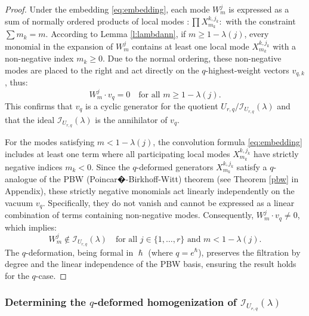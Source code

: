 \documentclass[reqno,11pt]{amsart}
\theoremstyle{plain}
\theoremstyle{definition}
\theoremstyle{remark}
\numberwithin{equation}{section}
\newcommand{\1}{\mathds{1}}
\newcommand{\2}{\frac{1}{2}}
\begin{document}
{\begin{proof}
					{Under the embedding \eqref{eq:embedding}, each mode $W^j_m$ is expressed as a sum of normally ordered products of local modes $: \prod X^{k,j_k}_{m_k} :$ with the constraint $\sum m_k = m$. 
						According to Lemma \ref{l:lambdann}, if $m \geq 1 - \lambda(j)$, every monomial in the expansion of $W^j_m$ contains at least one local mode $X^{k,j_k}_{m_k}$ with a non-negative index $m_k \geq 0$. Due to the normal ordering, these non-negative modes are placed to the right and act directly on the $q$-highest-weight vectors $v_{q,k}$, thus:
						\begin{equation}
							W^j_m \cdot v_q = 0 \quad \text{for all } m \geq 1 - \lambda(j).
						\end{equation}
						This confirms that $v_q$ is a cyclic generator for the quotient $U_{r,q} / \mathcal{I}_{U_{r,q}}(\lambda)$ and that the ideal $\mathcal{I}_{U_{r,q}}(\lambda)$ is the annihilator of $v_q$.}
					
					{For the modes satisfying $m < 1 - \lambda(j)$, the convolution formula \eqref{eq:embedding} includes at least one term where all participating local modes $X^{k,j_k}_{m_k}$ have strictly negative indices $m_k < 0$. 
						Since the $q$-deformed generators $X^{k,j_k}_{m_k}$ satisfy a $q$-analogue of the PBW (Poincar�-Birkhoff-Witt) theorem (see Theorem \ref{pbw} in Appendix), these strictly negative monomials act linearly independently on the vacuum $v_q$. Specifically, they do not vanish and cannot be expressed as a linear combination of terms containing non-negative modes. 
						Consequently, $W^j_m \cdot v_q \neq 0$, which implies:
						\begin{equation}
							W^j_m \notin \mathcal{I}_{U_{r,q}}(\lambda) \quad \text{for all } j \in \{1, \dots, r\} \text{ and } m < 1 - \lambda(j).
						\end{equation}
						The $q$-deformation, being formal in $\hslash$ (where $q=e^{\hslash}$), preserves the filtration by degree and the linear independence of the PBW basis, ensuring the result holds for the $q$-case.}
				\end{proof}

				\subsubsection{Determining the $q$-deformed homogenization of $\mathcal{I}_{U_{r,q}}(\lambda)$}\label{ssd}
				
}
\end{document}
